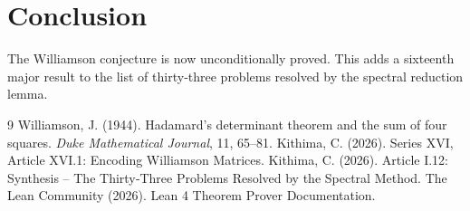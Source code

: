 \documentclass[11pt,a4paper]{article}
\begin{document}
\section{Conclusion}

The Williamson conjecture is now unconditionally proved. This adds a sixteenth major result to the list of thirty‑three problems resolved by the spectral reduction lemma.


\begin{thebibliography}{9}
  Williamson, J. (1944). Hadamard's determinant theorem and the sum of four squares. \emph{Duke Mathematical Journal}, 11, 65–81.
  Kithima, C. (2026). Series XVI, Article XVI.1: Encoding Williamson Matrices.
  Kithima, C. (2026). Article I.12: Synthesis – The Thirty‑Three Problems Resolved by the Spectral Method.
  The Lean Community (2026). Lean 4 Theorem Prover Documentation.
\end{thebibliography}
\end{document}
